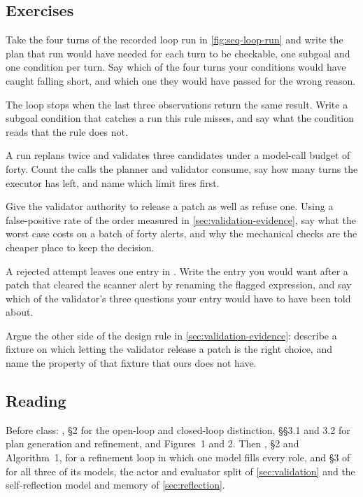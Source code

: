 \subsection{Exercises}

\be

\item Take the four turns of the recorded loop run in \cref{fig:seq-loop-run} and write the plan
that run would have needed for each turn to be checkable, one subgoal and one condition per turn.
Say which of the four turns your conditions would have caught falling short, and which one they
would have passed for the wrong reason.

\item The loop stops when the last three observations return the same result. Write a subgoal
condition that catches a run this rule misses, and say what the condition reads that the rule does
not.

\item A run replans twice and validates three candidates under a model-call budget of forty. Count
the calls the planner and validator consume, say how many turns the executor has left, and name
which limit fires first.

\item Give the validator authority to release a patch as well as refuse one. Using a false-positive
rate of the order measured in \cref{sec:validation-evidence}, say what the worst case costs on a
batch of forty alerts, and why the mechanical checks are the cheaper place to keep the decision.

\item A rejected attempt leaves one entry in . Write the entry you would want
after a patch that cleared the scanner alert by renaming the flagged expression, and say which of
the validator's three questions your entry would have to have been told about.

\item Argue the other side of the design rule in \cref{sec:validation-evidence}: describe a fixture
on which letting the validator release a patch is the right choice, and name the property of that
fixture that ours does not have.

\ee

\subsection{Reading}

Before class: \citet{sun2023adaplanner}, \S2 for the open-loop and closed-loop distinction, \S\S3.1
and 3.2 for plan generation and refinement, and Figures~1 and 2. Then
\citet{madaan2023selfrefine}, \S2 and Algorithm~1, for a refinement loop in which one model fills
every role, and \S3 of \citet{shinn2023reflexion} for all three of its models, the actor and
evaluator split of \cref{sec:validation} and the self-reflection model and memory of
\cref{sec:reflection}.

